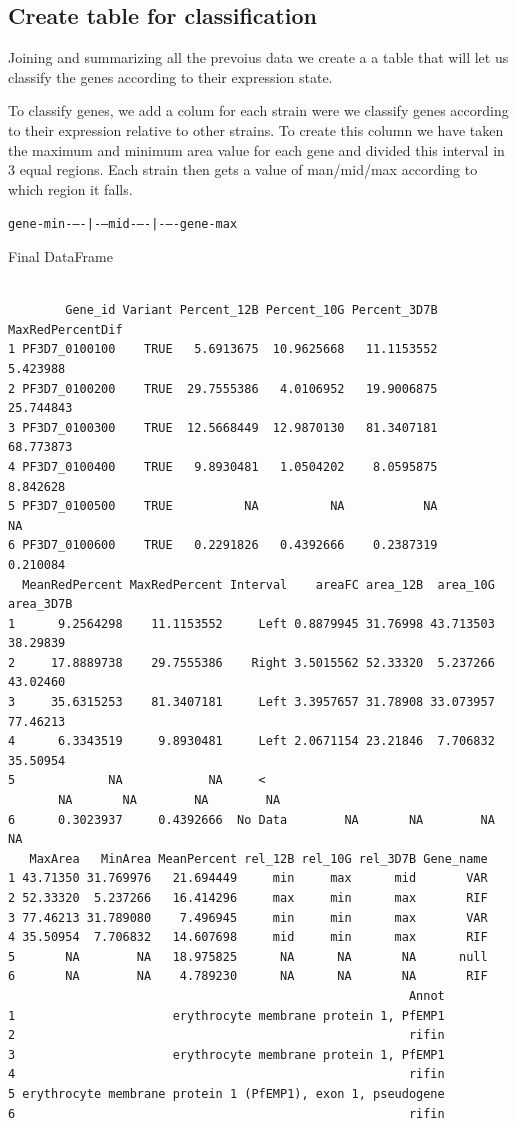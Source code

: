 \documentclass[11pt]{article}
\begin{document}
\subsection{Create table for classification}
\label{sec:orgad97d72}

Joining and summarizing all the prevoius data we create a a table that will let us classify the genes according to their expression state.

To classify genes, we add a colum for each strain were we classify genes according to their expression relative to other strains.
To create this column we have taken the maximum and minimum area value for each gene and divided this interval in 3 equal regions. Each strain then gets a value of man/mid/max according to which region it falls.

\texttt{gene-min-{}--{}-|-{}--mid-{}--{}-|-{}--{}-gene-max}

Final DataFrame
\begin{verbatim}

        Gene_id Variant Percent_12B Percent_10G Percent_3D7B MaxRedPercentDif
1 PF3D7_0100100    TRUE   5.6913675  10.9625668   11.1153552         5.423988
2 PF3D7_0100200    TRUE  29.7555386   4.0106952   19.9006875        25.744843
3 PF3D7_0100300    TRUE  12.5668449  12.9870130   81.3407181        68.773873
4 PF3D7_0100400    TRUE   9.8930481   1.0504202    8.0595875         8.842628
5 PF3D7_0100500    TRUE          NA          NA           NA               NA
6 PF3D7_0100600    TRUE   0.2291826   0.4392666    0.2387319         0.210084
  MeanRedPercent MaxRedPercent Interval    areaFC area_12B  area_10G area_3D7B
1      9.2564298    11.1153552     Left 0.8879945 31.76998 43.713503  38.29839
2     17.8889738    29.7555386    Right 3.5015562 52.33320  5.237266  43.02460
3     35.6315253    81.3407181     Left 3.3957657 31.78908 33.073957  77.46213
4      6.3343519     9.8930481     Left 2.0671154 23.21846  7.706832  35.50954
5             NA            NA     <
       NA       NA        NA        NA
6      0.3023937     0.4392666  No Data        NA       NA        NA        NA
   MaxArea   MinArea MeanPercent rel_12B rel_10G rel_3D7B Gene_name
1 43.71350 31.769976   21.694449     min     max      mid       VAR
2 52.33320  5.237266   16.414296     max     min      max       RIF
3 77.46213 31.789080    7.496945     min     min      max       VAR
4 35.50954  7.706832   14.607698     mid     min      max       RIF
5       NA        NA   18.975825      NA      NA       NA      null
6       NA        NA    4.789230      NA      NA       NA       RIF
                                                        Annot
1                      erythrocyte membrane protein 1, PfEMP1
2                                                       rifin
3                      erythrocyte membrane protein 1, PfEMP1
4                                                       rifin
5 erythrocyte membrane protein 1 (PfEMP1), exon 1, pseudogene
6                                                       rifin
\end{verbatim}
\end{document}
